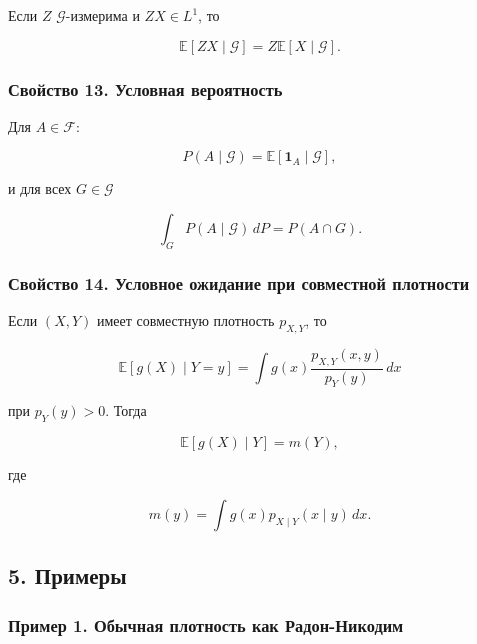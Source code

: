 \documentclass[
  11pt,
  a4paper,
]{article}
\begin{document}
Если \(Z\) \(\mathcal G\)-измерима и \(ZX\in L^1\), то

\[
\mathbb E[ZX\mid\mathcal G]
=
Z\mathbb E[X\mid\mathcal G].
\]

\subsubsection{Свойство 13. Условная
вероятность}\label{ux441ux432ux43eux439ux441ux442ux432ux43e-13.-ux443ux441ux43bux43eux432ux43dux430ux44f-ux432ux435ux440ux43eux44fux442ux43dux43eux441ux442ux44c}

Для \(A\in\mathcal F\):

\[
P(A\mid\mathcal G)=\mathbb E[\mathbf 1_A\mid\mathcal G],
\]

и для всех \(G\in\mathcal G\)

\[
\int_G P(A\mid\mathcal G)\,dP=P(A\cap G).
\]

\subsubsection{Свойство 14. Условное ожидание при совместной
плотности}\label{ux441ux432ux43eux439ux441ux442ux432ux43e-14.-ux443ux441ux43bux43eux432ux43dux43eux435-ux43eux436ux438ux434ux430ux43dux438ux435-ux43fux440ux438-ux441ux43eux432ux43cux435ux441ux442ux43dux43eux439-ux43fux43bux43eux442ux43dux43eux441ux442ux438}

Если \((X,Y)\) имеет совместную плотность \(p_{X,Y}\), то

\[
\mathbb E[g(X)\mid Y=y]
=
\int g(x)\frac{p_{X,Y}(x,y)}{p_Y(y)}\,dx
\]

при \(p_Y(y)>0\). Тогда

\[
\mathbb E[g(X)\mid Y]=m(Y),
\]

где

\[
m(y)=\int g(x)p_{X\mid Y}(x\mid y)\,dx.
\]

\subsection{5. Примеры}\label{ux43fux440ux438ux43cux435ux440ux44b}

\subsubsection{Пример 1. Обычная плотность как
Радон-Никодим}\label{ux43fux440ux438ux43cux435ux440-1.-ux43eux431ux44bux447ux43dux430ux44f-ux43fux43bux43eux442ux43dux43eux441ux442ux44c-ux43aux430ux43a-ux440ux430ux434ux43eux43d-ux43dux438ux43aux43eux434ux438ux43c}
\end{document}
